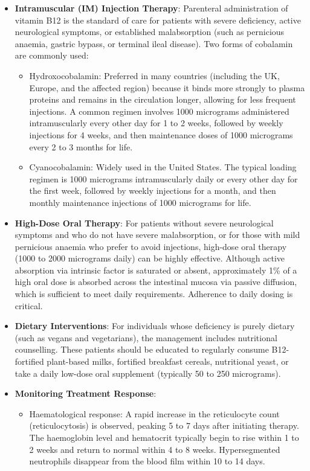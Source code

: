 \begin{itemize}
    \item \textbf{Intramuscular (IM) Injection Therapy}: Parenteral administration of vitamin B12 is the standard of care for patients with severe deficiency, active neurological symptoms, or established malabsorption (such as pernicious anaemia, gastric bypass, or terminal ileal disease). Two forms of cobalamin are commonly used:
    \begin{itemize}
        \item Hydroxocobalamin: Preferred in many countries (including the UK, Europe, and the affected region) because it binds more strongly to plasma proteins and remains in the circulation longer, allowing for less frequent injections. A common regimen involves 1000 micrograms administered intramuscularly every other day for 1 to 2 weeks, followed by weekly injections for 4 weeks, and then maintenance doses of 1000 micrograms every 2 to 3 months for life.
        \item Cyanocobalamin: Widely used in the United States. The typical loading regimen is 1000 micrograms intramuscularly daily or every other day for the first week, followed by weekly injections for a month, and then monthly maintenance injections of 1000 micrograms for life.
    \end{itemize}
    \item \textbf{High-Dose Oral Therapy}: For patients without severe neurological symptoms and who do not have severe malabsorption, or for those with mild pernicious anaemia who prefer to avoid injections, high-dose oral therapy (1000 to 2000 micrograms daily) can be highly effective. Although active absorption via intrinsic factor is saturated or absent, approximately 1\% of a high oral dose is absorbed across the intestinal mucosa via passive diffusion, which is sufficient to meet daily requirements. Adherence to daily dosing is critical.
    \item \textbf{Dietary Interventions}: For individuals whose deficiency is purely dietary (such as vegans and vegetarians), the management includes nutritional counselling. These patients should be educated to regularly consume B12-fortified plant-based milks, fortified breakfast cereals, nutritional yeast, or take a daily low-dose oral supplement (typically 50 to 250 micrograms).
    \item \textbf{Monitoring Treatment Response}:
    \begin{itemize}
        \item Haematological response: A rapid increase in the reticulocyte count (reticulocytosis) is observed, peaking 5 to 7 days after initiating therapy. The haemoglobin level and hematocrit typically begin to rise within 1 to 2 weeks and return to normal within 4 to 8 weeks. Hypersegmented neutrophils disappear from the blood film within 10 to 14 days.

\end{itemize}
\end{itemize}
